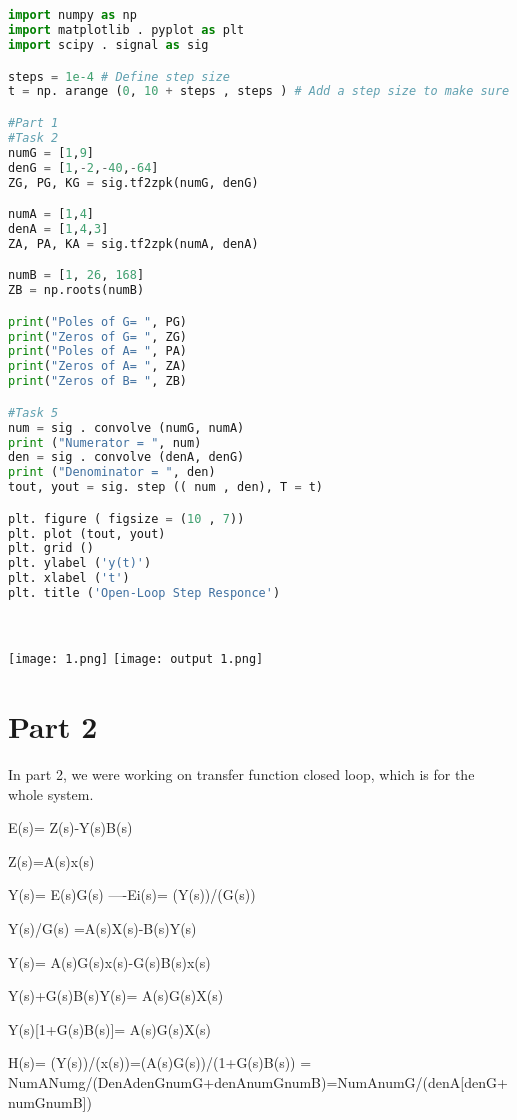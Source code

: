 \documentclass[12pt]{report}
\begin{document}
    









\begin{lstlisting}[language=Python]


import numpy as np
import matplotlib . pyplot as plt
import scipy . signal as sig

steps = 1e-4 # Define step size
t = np. arange (0, 10 + steps , steps ) # Add a step size to make sure the

#Part 1
#Task 2
numG = [1,9]
denG = [1,-2,-40,-64]
ZG, PG, KG = sig.tf2zpk(numG, denG)

numA = [1,4]
denA = [1,4,3]
ZA, PA, KA = sig.tf2zpk(numA, denA)

numB = [1, 26, 168]
ZB = np.roots(numB)

print("Poles of G= ", PG)
print("Zeros of G= ", ZG)
print("Poles of A= ", PA)
print("Zeros of A= ", ZA)
print("Zeros of B= ", ZB)

#Task 5
num = sig . convolve (numG, numA)
print ("Numerator = ", num)
den = sig . convolve (denA, denG)
print ("Denominator = ", den)
tout, yout = sig. step (( num , den), T = t)

plt. figure ( figsize = (10 , 7))
plt. plot (tout, yout)
plt. grid ()
plt. ylabel ('y(t)')
plt. xlabel ('t')
plt. title ('Open-Loop Step Responce')




\end{lstlisting}

\texttt{[image: 1.png]}
\texttt{[image: output 1.png]}
\section{Part 2 }

In part 2, we were working on transfer function closed loop, which is for the whole system.


E(s)= Z(s)-Y(s)B(s)

Z(s)=A(s)x(s)

Y(s)= E(s)G(s)   ----Ei(s)= (Y(s))/(G(s))

Y(s)/G(s) =A(s)X(s)-B(s)Y(s)

Y(s)= A(s)G(s)x(s)-G(s)B(s)x(s)

Y(s)+G(s)B(s)Y(s)= A(s)G(s)X(s)

Y(s)[1+G(s)B(s)]= A(s)G(s)X(s)

H(s)= (Y(s))/(x(s))=(A(s)G(s))/(1+G(s)B(s))
=
NumANumg/(DenAdenGnumG+denAnumGnumB)=NumAnumG/(denA[denG+numGnumB])
\end{document}
